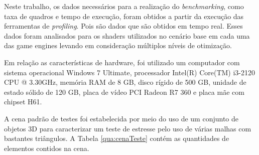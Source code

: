 Neste trabalho, os dados necessários para a realização do \textit{benchmarking}, como taxa de quadros e tempo de execução, foram obtidos a partir da execução das ferramentas de \textit{profiling}. Pois são dados que são obtidos em tempo real. Esses dados foram analisados para os shaders utilizados no cenário base em cada uma das game engines levando em consideração múltiplos níveis de otimização.

Em relação as características de hardware, foi utilizado um computador com sistema operacional Windows 7 Ultimate, processador Intel(R) Core(TM) i3-2120 CPU @ 3.30GHz, memória RAM de 8 GB, disco rígido de 500 GB, unidade de estado sólido de 120 GB, placa de vídeo PCI Radeon R7 360 e placa mãe com chipset H61.

A cena padrão de testes foi estabelecida por meio do uso de um conjunto de objetos 3D para caracterizar um teste de estresse pelo uso de várias malhas com bastantes triângulos. A Tabela \ref{qua:cenaTeste} contém as quantidades de elementos contidos na cena.


 